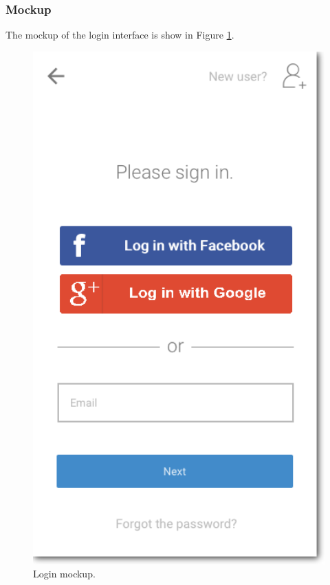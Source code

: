 \subsubsection{Mockup}
The mockup of the login interface is show in Figure \ref{fig:MockupLogin}.
\begin{figure}
	\centering
	\includegraphics[width=4.5in]{./images/login.png}
	\caption{Login mockup.}
	\label{fig:MockupLogin}
\end{figure}